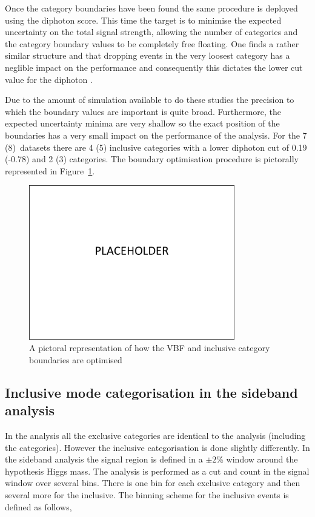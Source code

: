 Once the \VBF category boundaries have been found the same procedure is deployed using the diphoton \BDT score. This time the target is to minimise the expected uncertainty on the total signal strength, allowing the number of categories and the category boundary values to be completely free floating. One finds a rather similar structure and that dropping events in the very loosest category has a neglible impact on the performance and consequently this dictates the lower cut value for the diphoton \BDT. 

Due to the amount of simulation \MC available to do these studies the precision to which the boundary values are important is quite broad. Furthermore, the expected uncertainty minima are very shallow so the exact position of the boundaries has a very small impact on the performance of the analysis. For the 7 (8)~\TeV datasets there are 4 (5) inclusive categories with a lower diphoton \BDT cut of 0.19 (-0.78) and 2 (3) \VBF categories. The boundary optimisation procedure is pictorally represented in Figure~\ref{fig:bdt_boundaries_pic}.

\begin{figure}
  \includegraphics[width=0.8\textwidth]{placeholder.pdf}
  \caption{A pictoral representation of how the VBF and inclusive category boundaries are optimised}
  \label{fig:bdt_boundaries_pic}
\end{figure}

\subsection{Inclusive mode categorisation in the sideband \MVA analysis}
\label{sec:inclusive_cats_sideband}

In the \SMVA analysis all the exclusive categories are identical to the \MFM analysis (including the \VBF categories). However the inclusive categorisation is done slightly differently. In the sideband analysis the signal region is defined in a $\pm2$\% window around the hypothesis Higgs mass. The analysis is performed as a cut and count in the signal window over several bins. There is one bin for each exclusive category and then several more for the inclusive. The binning scheme for the inclusive events is defined as follows,

